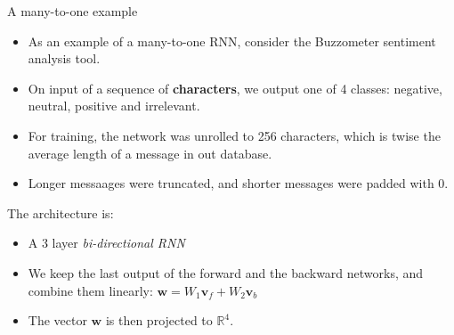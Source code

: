 \documentclass[10pt]{beamer}
\newcommand{\R}{\mathbb{R}}
\renewcommand{\v}{\mathbf{v}}
\newcommand{\w}{\mathbf{w}}
\begin{document}
\begin{frame}{A many-to-one example}
\begin{itemize}
  \item As an example of a many-to-one RNN, consider the Buzzometer sentiment analysis tool.
  \item On input of a sequence of {\bf characters}, we output one of 4 classes: negative, neutral, positive and irrelevant.
  \item For training, the network was unrolled to 256 characters, which is twise the average length of a message in out database.
  \item Longer messaages were truncated, and shorter messages were padded with $0$.
\end{itemize}

The architecture is:
\begin{itemize}
  \item A 3 layer {\em bi-directional RNN}
  \item We keep the last output of the forward and the backward networks, and combine them linearly: $\w=W_1 \v_f + W_2\v_b$
  \item The vector $\w$ is then projected to $\R^4$.
\end{itemize}
\end{frame}
\end{document}
